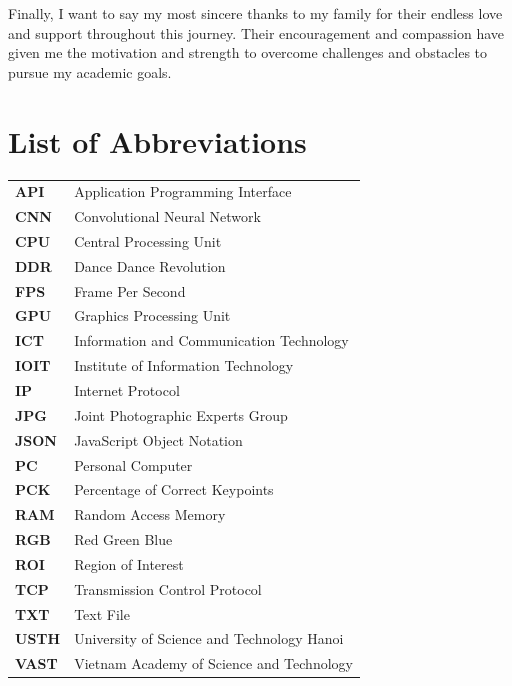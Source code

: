 \documentclass[12pt]{article}
\begin{document}
Finally, I want to say my most sincere thanks to my family for their endless love and support throughout this journey. Their encouragement and compassion have given me the motivation and strength to overcome challenges and obstacles to pursue my academic goals.
\clearpage

\section*{List of Abbreviations}
\renewcommand{\arraystretch}{1.5}
\vspace{0.2cm}
\begin{tabular}{@{} >{\bfseries\raggedleft\arraybackslash}p{} p{}@{}}
    API  & Application Programming Interface          \\
    CNN  & Convolutional Neural Network               \\
    CPU  & Central Processing Unit                    \\
    DDR  & Dance Dance Revolution                     \\
    FPS  & Frame Per Second                           \\
    GPU  & Graphics Processing Unit                   \\
    ICT  & Information and Communication Technology   \\
    IOIT & Institute of Information Technology        \\
    IP   & Internet Protocol                          \\
    JPG  & Joint Photographic Experts Group           \\
    JSON & JavaScript Object Notation                 \\
    PC   & Personal Computer                          \\
    PCK  & Percentage of Correct Keypoints            \\
    RAM  & Random Access Memory                       \\
    RGB  & Red Green Blue                             \\
    ROI  & Region of Interest                         \\
    TCP  & Transmission Control Protocol              \\
    TXT  & Text File                                  \\
    USTH & University of Science and Technology Hanoi \\
    VAST & Vietnam Academy of Science and Technology  \\
\end{tabular}
\clearpage
\end{document}
